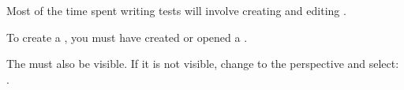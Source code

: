 
Most of the time spent writing tests will involve creating and editing \gdcases{}. 

To create a \gdcase{}, you must have created or opened a \gdproject{} . 

The \gdtestcasebrowser{} must also be visible. If it is not visible, change to the \specpersp{} perspective and select:\\
.


